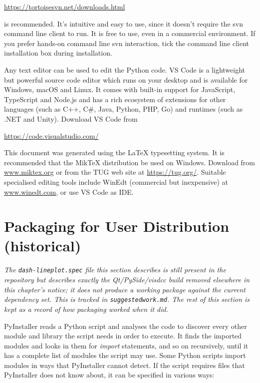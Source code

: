 \url{https://tortoisesvn.net/downloads.html}

is recommended. It's intuitive and easy to use, since it doesn't require the \ac{svn} command line client to run. It is free to use, even in a commercial environment. If you prefer hands-on command line \ac{svn} interaction, tick the command line client installation box during installation.

Any text editor can be used to edit the Python code. \ac{VS} Code is a lightweight but powerful source code editor which runs on your desktop and is available for Windows, macOS and Linux. It comes with built-in support for JavaScript, TypeScript and Node.js and has a rich ecosystem of extensions for other languages (such as C++, C\#, Java, Python, PHP, Go) and runtimes (such as .NET and Unity). Download \ac{VS} Code from

\url{https://code.visualstudio.com/}

This document was generated using the \LaTeX{} typesetting system. It is recommended that the MikTeX distribution be used on Windows. Download from \url{www.miktex.org} or from the \ac{TUG} web site at \url{https://tug.org/}. Suitable specialised editing tools include WinEdt (commercial but inexpensive) at \url{www.winedt.com}, or use \ac{VS} Code as \ac{IDE}.


\section{Packaging for User Distribution (historical)}
\label{sec:pyinstaller}

\textit{The \texttt{dash-lineplot.spec} file this section describes is
still present in the repository but describes exactly the Qt/PySide/visdcc
build removed elsewhere in this chapter's notice; it does not produce a
working package against the current dependency set. This is tracked in
\texttt{suggestedwork.md}. The rest of this section is kept as a record of
how packaging worked when it did.}

PyInstaller reads a Python script and analyses the code to discover every other module and library the script needs in order to execute.
It finds the imported modules and looks in them for \textit{import} statements, and so on recursively, until it has a complete list of modules the script may use.
Some Python scripts import modules in ways that PyInstaller cannot detect. If the script requires files that PyInstaller does not know about, it can be specified in various ways:

